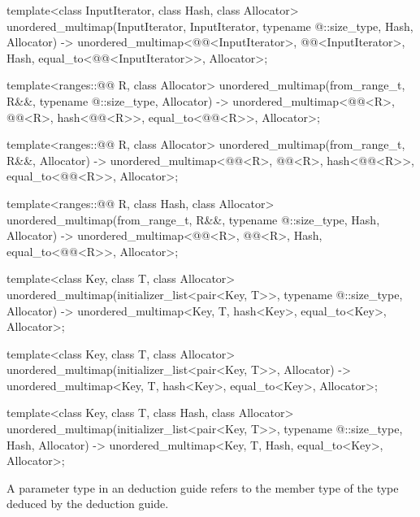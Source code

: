 \begin{codeblock}
{  template<class InputIterator, class Hash, class Allocator>
    unordered_multimap(InputIterator, InputIterator, typename @\seebelow@::size_type, Hash,
                       Allocator)
      -> unordered_multimap<@@<InputIterator>, @@<InputIterator>, Hash,
                            equal_to<@@<InputIterator>>, Allocator>;

  template<ranges::@@ R, class Allocator>
    unordered_multimap(from_range_t, R&&, typename @\seebelow@::size_type, Allocator)
      -> unordered_multimap<@@<R>, @@<R>, hash<@@<R>>,
                            equal_to<@@<R>>, Allocator>;

  template<ranges::@@ R, class Allocator>
    unordered_multimap(from_range_t, R&&, Allocator)
      -> unordered_multimap<@@<R>, @@<R>, hash<@@<R>>,
                            equal_to<@@<R>>, Allocator>;

  template<ranges::@@ R, class Hash, class Allocator>
    unordered_multimap(from_range_t, R&&, typename @\seebelow@::size_type, Hash, Allocator)
      -> unordered_multimap<@@<R>, @@<R>, Hash,
                            equal_to<@@<R>>, Allocator>;

  template<class Key, class T, class Allocator>
    unordered_multimap(initializer_list<pair<Key, T>>, typename @\seebelow@::size_type,
                       Allocator)
      -> unordered_multimap<Key, T, hash<Key>, equal_to<Key>, Allocator>;

  template<class Key, class T, class Allocator>
    unordered_multimap(initializer_list<pair<Key, T>>, Allocator)
      -> unordered_multimap<Key, T, hash<Key>, equal_to<Key>, Allocator>;

  template<class Key, class T, class Hash, class Allocator>
    unordered_multimap(initializer_list<pair<Key, T>>, typename @\seebelow@::size_type,
                       Hash, Allocator)
      -> unordered_multimap<Key, T, Hash, equal_to<Key>, Allocator>;
}
\end{codeblock}

\pnum
A  parameter type in an  deduction guide
refers to the  member type of the type deduced by the deduction guide.

